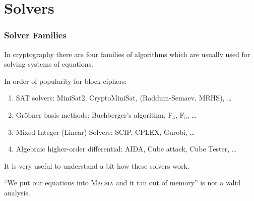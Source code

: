 \documentclass[9pt]{beamer}
\begin{document}
\section{Solvers}

\begin{frame}
\frametitle{Solver Families} 

\vfill

In cryptography there are four families of algorithms which are usually used for solving systems of equations.

\vfill

In order of popularity for block ciphers:
\begin{enumerate}
 \item SAT solvers: MiniSat2, CryptoMiniSat, (Raddum-Semaev, MRHS), \dots
 \item Gröbner basis methods: Buchberger's algorithm, F$_4$, F$_5$, \dots
 \item Mixed Integer (Linear) Solvers: SCIP, CPLEX, Gurobi, \dots
 \item Algebraic higher-order differential: AIDA, Cube attack, Cube Tester, \dots
\end{enumerate}

\vfill

It is very useful to understand a bit how these solvers work.

\vfill

\begin{block}{}
``We put our equations into \textsc{Magma} and it ran out of memory'' is not a valid analysis.
\end{block}

\vfill

\end{frame}
\end{document}
